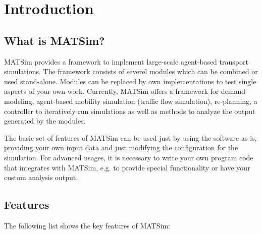 \chapter{Introduction}

 
\bigskip

\section{What is MATSim?}

MATSim provides a framework to implement large-scale agent-based transport
simulations. The framework consists of severel modules which can be combined or
used stand-alone. Modules can be replaced by own implementations to test single
aspects of your own work. Currently, MATSim offers a framework for
demand-modeling, agent-based mobility simulation (traffic flow simulation),
re-planning, a controller to iteratively run simulations as well as methods to
analyze the output generated by the modules.

The basic set of features of MATSim can be used just by using the software as
is, providing your own input data and just modifying the configuration for the
simulation. For advanced usages, it is necessary to write your own program code
that integrates with MATSim, e.g. to provide special functionality or have your
custom analysis output.


\section{Features}

The following list shows the key features of MATSim:

